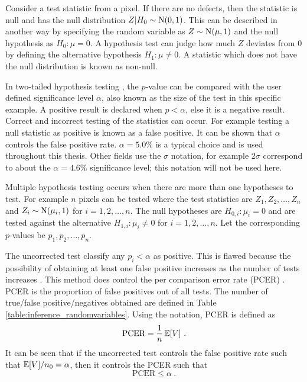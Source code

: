 Consider a test statistic from a pixel. If there are no defects, then the statistic is null and has the null distribution $Z|H_0\sim\operatorname{N}(0,1)$. This can be described in another way by specifying the random variable as $Z\sim\operatorname{N}(\mu,1)$ and the null hypothesis as $H_0:\mu=0$. A hypothesis test can judge how much $Z$ deviates from 0 by defining the alternative hypothesis $H_1:\mu\neq 0$. A statistic which does not have the null distribution is known as non-null.

In two-tailed hypothesis testing \citep{pearson1900on, neyman1933on, fisher1970statistical}, the $p$-value can be compared with the user defined significance level $\alpha$, also known as the size of the test in this specific example. A positive result is declared when $p<\alpha$, else it is a negative result. Correct and incorrect testing of the statistics can occur. For example testing a null statistic as positive is known as a false positive. It can be shown that $\alpha$ controls the false positive rate. $\alpha=5.0\%$ is a typical choice and is used throughout this thesis. Other fields use the $\sigma$ notation, for example $2\sigma$ correspond to about the $\alpha = 4.6\%$ significance level; this notation will not be used here.

Multiple hypothesis testing occurs when there are more than one hypotheses to test. For example $n$ pixels can be tested where the test statistics are $Z_1, Z_2, \dotsc, Z_n$ and $Z_i\sim\operatorname{N}(\mu_i,1)$ for $i=1,2,\dotsc,n$. The null hypotheses are $H_{0,i}:\mu_i=0$ and are tested against the alternative $H_{1,i}:\mu_i\neq 0$ for $i=1,2,\dotsc,n$. Let the corresponding $p$-values be $p_1, p_2, \dotsc, p_n$.

The uncorrected test classify any $p_i<\alpha$ as positive. This is flawed because the possibility of obtaining at least one false positive increases as the number of tests increases \citep{shaffer1995multiple}. This method does control the per comparison error rate (PCER) \citep{benjamini1995controlling}. PCER is the proportion of false positives out of all tests. The number of true/false positive/negatives obtained are defined in Table \ref{table:inference_randomvariables}. Using the notation, PCER is defined as
\begin{equation}
  \text{PCER}=
  \dfrac{1}{n}
  \operatorname{\mathbb{E}}[V]
  \ .
\end{equation}
It can be seen that if the uncorrected test controls the false positive rate such that $\operatorname{\mathbb{E}}[V]/n_0 = \alpha$, then it controls the PCER such that
\begin{equation}
  \text{PCER}\leqslant\alpha \ .
\end{equation}

